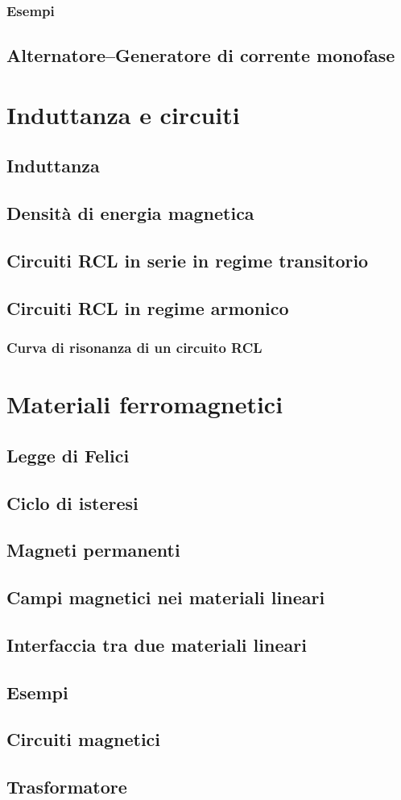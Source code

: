 \documentclass{book}
\begin{document}
\subsection{Esempi}
\section{Alternatore--Generatore di corrente monofase}

\chapter{Induttanza e circuiti}
\section{Induttanza}
\section{Densit\`a di energia magnetica}
\section{Circuiti RCL in serie in regime transitorio}
\section{Circuiti RCL in regime armonico}
\subsection{Curva di risonanza di un circuito RCL}

\chapter{Materiali ferromagnetici}
\section{Legge di Felici}
\section{Ciclo di isteresi}
\section{Magneti permanenti}
\section{Campi magnetici nei materiali lineari}
\section{Interfaccia tra due materiali lineari}
\section{Esempi}
\section{Circuiti magnetici}
\section{Trasformatore}
\end{document}
